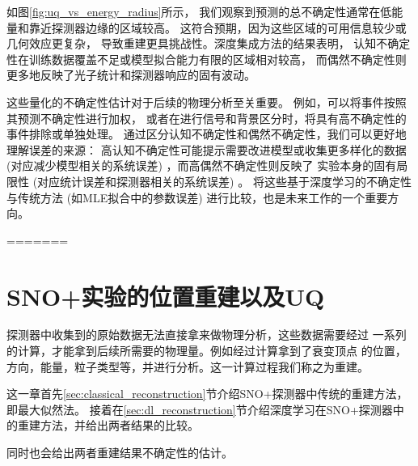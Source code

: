 
如图\ref{fig:uq_vs_energy_radius}所示，
我们观察到预测的总不确定性通常在低能量和靠近探测器边缘的区域较高。
这符合预期，因为这些区域的可用信息较少或几何效应更复杂，
导致重建更具挑战性。深度集成方法的结果表明，
认知不确定性在训练数据覆盖不足或模型拟合能力有限的区域相对较高，
而偶然不确定性则更多地反映了光子统计和探测器响应的固有波动。


这些量化的不确定性估计对于后续的物理分析至关重要。
例如，可以将事件按照其预测不确定性进行加权，
或者在进行信号和背景区分时，将具有高不确定性的事件排除或单独处理。
通过区分认知不确定性和偶然不确定性，我们可以更好地理解误差的来源：
高认知不确定性可能提示需要改进模型或收集更多样化的数据 
(对应减少模型相关的系统误差) ，而高偶然不确定性则反映了
实验本身的固有局限性 (对应统计误差和探测器相关的系统误差) 。
将这些基于深度学习的不确定性与传统方法 
(如MLE拟合中的参数误差) 进行比较，也是未来工作的一个重要方向。

=======
\chapter{SNO+实验的位置重建以及UQ}

探测器中收集到的原始数据无法直接拿来做物理分析，这些数据需要经过
一系列的计算，才能拿到后续所需要的物理量。例如经过计算拿到了衰变顶点
的位置，方向，能量，粒子类型等，并进行分析。这一计算过程我们称之为重建。

这一章首先\ref{sec:classical_reconstruction}节介绍SNO+探测器中传统的重建方法，即最大似然法。
接着在\ref{sec:dl_reconstruction}节介绍深度学习在SNO+探测器中的重建方法，并给出两者结果的比较。

同时也会给出两者重建结果不确定性的估计。

